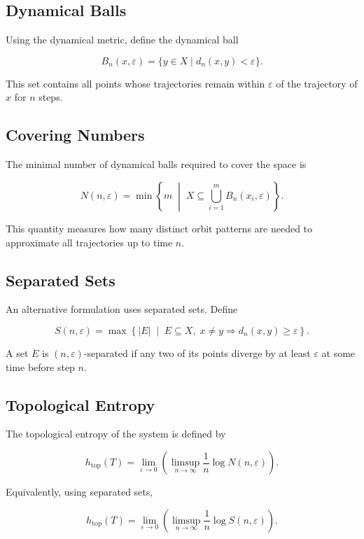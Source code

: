 \documentclass[12pt]{article}
\begin{document}
\subsection{Dynamical Balls}

Using the dynamical metric, define the dynamical ball

\[
B_n(x,\varepsilon) =
\{ y \in X \mid d_n(x,y) < \varepsilon \}.
\]

This set contains all points whose trajectories remain within $\varepsilon$ of the trajectory of $x$ for $n$ steps.

\subsection{Covering Numbers}

The minimal number of dynamical balls required to cover the space is

\[
N(n,\varepsilon) =
\min
\left\{
m \;\middle|\;
X \subseteq \bigcup_{i=1}^m B_n(x_i,\varepsilon)
\right\}.
\]

This quantity measures how many distinct orbit patterns are needed to approximate all trajectories up to time $n$.

\subsection{Separated Sets}

An alternative formulation uses separated sets. Define

\[
S(n,\varepsilon) =
\max
\left\{
|E| \;\middle|\;
E \subseteq X,\;
x \neq y \Rightarrow d_n(x,y) \ge \varepsilon
\right\}.
\]

A set $E$ is $(n,\varepsilon)$-separated if any two of its points diverge by at least $\varepsilon$ at some time before step $n$.

\subsection{Topological Entropy}

The topological entropy of the system is defined by

\[
h_{\mathrm{top}}(T)
=
\lim_{\varepsilon \to 0}
\left(
\limsup_{n \to \infty}
\frac{1}{n} \log N(n,\varepsilon)
\right).
\]

Equivalently, using separated sets,

\[
h_{\mathrm{top}}(T)
=
\lim_{\varepsilon \to 0}
\left(
\limsup_{n \to \infty}
\frac{1}{n} \log S(n,\varepsilon)
\right).
\]
\end{document}
